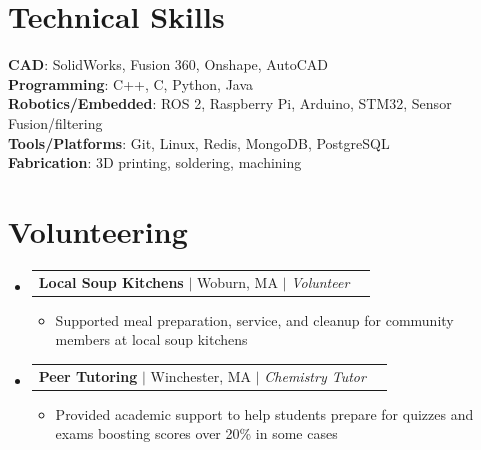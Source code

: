 \documentclass[letterpaper,11pt]{article}
\makeatletter
\newcommand{\resumeItem}[1]{
  \item\small{
    {#1 \vspace{-2pt}}
  }
}
\newcommand{\resumeSubheading}[4]{
  \vspace{-2pt}\item
    \begin{tabular*}{0.97\textwidth}[t]{l@{\extracolsep{\fill}}r}
      \textbf{#1} $|$ #2 $|$ \textit{#3} & \textit{\small #4} \\
    \end{tabular*}\vspace{-7pt}
}
\newcommand{\resumeSubHeadingListStart}{\begin{itemize}[leftmargin=0.15in, label={}]}
\newcommand{\resumeSubHeadingListEnd}{\end{itemize}}
\newcommand{\resumeItemListStart}{\begin{itemize}}
\newcommand{\resumeItemListEnd}{\end{itemize}\vspace{-5pt}}
\makeatother
\begin{document}

\section{Technical Skills}
 \begin{itemize}[leftmargin=0.15in, label={}]
    \small{\item{
     \textbf{CAD}{: SolidWorks, Fusion 360, Onshape, AutoCAD} \\
     \textbf{Programming}{: C++, C, Python, Java} \\
     \textbf{Robotics/Embedded}{: ROS 2, Raspberry Pi, Arduino, STM32, Sensor Fusion/filtering} \\
     \textbf{Tools/Platforms}{: Git, Linux, Redis, MongoDB, PostgreSQL} \\
     \textbf{Fabrication}{: 3D printing, soldering, machining}
    }}
 \end{itemize}



\section{Volunteering}
  \resumeSubHeadingListStart

    \resumeSubheading
      {Local Soup Kitchens}
      {Woburn, MA}
      {Volunteer}
      {}
      \resumeItemListStart
        \resumeItem{Supported meal preparation, service, and cleanup for community members at local soup kitchens}
      \resumeItemListEnd

    \resumeSubheading
      {Peer Tutoring}
      {Winchester, MA}
      {Chemistry Tutor}
      {}
      \resumeItemListStart
        \resumeItem{Provided academic support to help students prepare for quizzes and exams boosting scores over 20\% in some cases}
      \resumeItemListEnd

  \resumeSubHeadingListEnd


\end{document}
